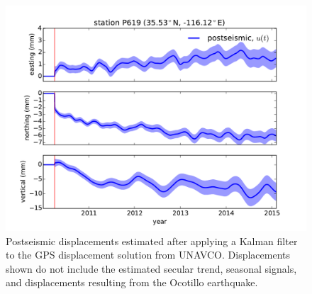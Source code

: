 \documentclass[12pt]{article}
\begin{document}
\begin{figure}

\includegraphics[scale=0.6]{Figures/figure_4}
\centering
\caption{Postseismic displacements estimated after applying a Kalman filter to the GPS displacement solution from UNAVCO.  Displacements shown do not include the estimated secular trend, seasonal signals, and displacements resulting from the Ocotillo earthquake.} 
\label{P619PS}
\end{figure}
\end{document}
